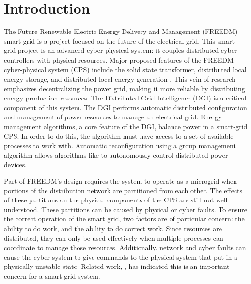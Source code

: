 
\section{Introduction}

The Future Renewable Electric Energy Delivery and Management (FREEDM) smart grid is a project focused on the future of the electrical grid.
This smart grid project is an advanced cyber-physical system: it couples distributed cyber controllers with physical resources.
Major proposed features of the FREEDM cyber-physical system (CPS) include the solid state transformer, distributed local energy storage, and distributed local energy generation \cite{FREEDMMIGRATION}.
This vein of research emphasizes decentralizing the power grid, making it more reliable by distributing energy production resources.
The Distributed Grid Intelligence (DGI) is a critical component of this system.
The DGI performs automatic distributed configuration and management of power resources to manage an electrical grid.
Energy management algorithms, a core feature of the DGI\cite{LOADBALANCING}, balance power in a smart-grid CPS.
In order to do this, the algorithm must have access to a set of available processes to work with.
Automatic reconfiguration using a group management algorithm allows algorithms like \cite{LOADBALANCING}\cite{ICC1}\cite{MOYEEN} to autonomously control distributed power devices.

Part of FREEDM's design requires the system to operate as a microgrid when portions of the distribution network are partitioned from each other.
The effects of these partitions on the physical components of the CPS are still not well understood.
These partitions can be caused by physical or cyber faults.
To ensure the correct operation of the smart grid, two factors are of particular concern: the ability to do work, and the ability to do correct work.
Since resources are distributed, they can only be used effectively when multiple processes can coordinate to manage those resources.
Additionally, network and cyber faults can cause the cyber system to give commands to the physical system that put in a physically unstable state.
Related work, \cite{HARINI}\cite{TSG}\cite{ICC2}\cite{SGNETFAULT}, has indicated this is an important concern for a smart-grid system.

